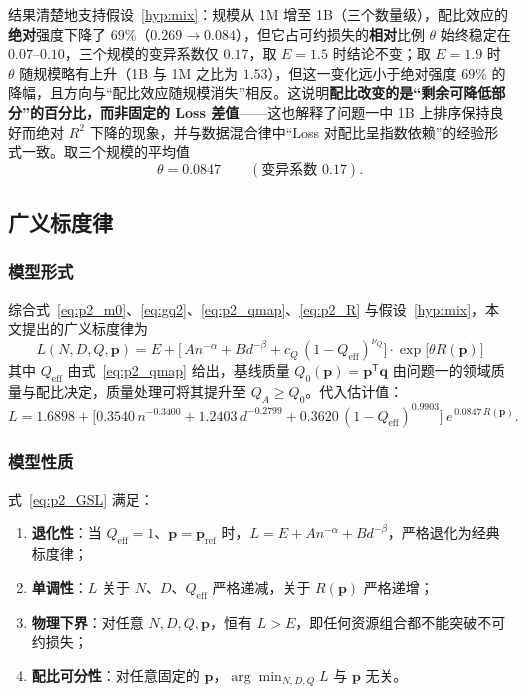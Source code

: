 结果清楚地支持假设~\ref{hyp:mix}：规模从 1M 增至 1B（三个数量级），配比效应的\textbf{绝对}强度下降了 $69\%$（$0.269\to0.084$），但它占可约损失的\textbf{相对}比例 $\theta$ 始终稳定在 $0.07$--$0.10$，三个规模的变异系数仅 $0.17$，取 $E=1.5$ 时结论不变；取 $E=1.9$ 时 $\theta$ 随规模略有上升（1B 与 1M 之比为 $1.53$），但这一变化远小于绝对强度 $69\%$ 的降幅，且方向与“配比效应随规模消失”相反。这说明\textbf{配比改变的是“剩余可降低部分”的百分比，而非固定的 Loss 差值}——这也解释了问题一中 1B 上排序保持良好而绝对 $R^2$ 下降的现象，并与数据混合律中“Loss 对配比呈指数依赖”的经验形式一致\cite{ye2025datamixinglaws}。取三个规模的平均值
\begin{equation}
\theta=0.0847\qquad(\text{变异系数 } 0.17).
\label{eq:p2_theta_est}
\end{equation}

\subsection{广义标度律}

\subsubsection{模型形式}

综合式~\eqref{eq:p2_m0}、\eqref{eq:gq2}、\eqref{eq:p2_qmap}、\eqref{eq:p2_R} 与假设~\ref{hyp:mix}，本文提出的广义标度律为
\begin{equation}
\boxed{\;
L(N,D,Q,\boldsymbol p)=E+\Big[\,A n^{-\alpha}+B d^{-\beta}+c_Q\,(1-Q_{\mathrm{eff}})^{\nu_Q}\Big]\cdot \exp\!\big[\theta R(\boldsymbol p)\big]
\;}
\label{eq:p2_GSL}
\end{equation}
其中 $Q_{\mathrm{eff}}$ 由式~\eqref{eq:p2_qmap} 给出，基线质量 $Q_0(\boldsymbol p)=\boldsymbol p^{\mathsf T}\boldsymbol q$ 由问题一的领域质量与配比决定，质量处理可将其提升至 $Q_A\ge Q_0$。代入估计值：
\begin{equation}
L=1.6898+\Big[0.3540\,n^{-0.3400}+1.2403\,d^{-0.2799}+0.3620\,(1-Q_{\mathrm{eff}})^{0.9903}\Big]\,e^{\,0.0847\,R(\boldsymbol p)} .
\label{eq:p2_GSL_num}
\end{equation}

\subsubsection{模型性质}

\begin{theorem}[广义标度律的基本性质]\label{thm:gsl}
式~\eqref{eq:p2_GSL} 满足：
\begin{enumerate}
\item \textbf{退化性}：当 $Q_{\mathrm{eff}}=1$、$\boldsymbol p=\boldsymbol p_{\mathrm{ref}}$ 时，$L=E+An^{-\alpha}+Bd^{-\beta}$，严格退化为经典标度律；
\item \textbf{单调性}：$L$ 关于 $N$、$D$、$Q_{\mathrm{eff}}$ 严格递减，关于 $R(\boldsymbol p)$ 严格递增；
\item \textbf{物理下界}：对任意 $N,D,Q,\boldsymbol p$，恒有 $L>E$，即任何资源组合都不能突破不可约损失；
\item \textbf{配比可分性}：对任意固定的 $\boldsymbol p$，$\arg\min_{N,D,Q}L$ 与 $\boldsymbol p$ 无关。
\end{enumerate}
\end{theorem}

